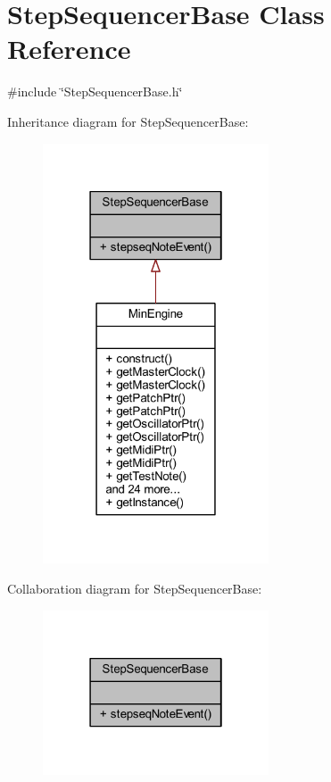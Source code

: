 \hypertarget{class_step_sequencer_base}{}\section{Step\+Sequencer\+Base Class Reference}
\label{class_step_sequencer_base}


{\ttfamily \#include \char`\"{}Step\+Sequencer\+Base.\+h\char`\"{}}



Inheritance diagram for Step\+Sequencer\+Base\+:
\nopagebreak
\begin{figure}[H]
\begin{center}
\leavevmode
\includegraphics[width=190pt]{d1/d60/class_step_sequencer_base__inherit__graph}
\end{center}
\end{figure}


Collaboration diagram for Step\+Sequencer\+Base\+:
\nopagebreak
\begin{figure}[H]
\begin{center}
\leavevmode
\includegraphics[width=190pt]{d9/d7a/class_step_sequencer_base__coll__graph}
\end{center}
\end{figure}
